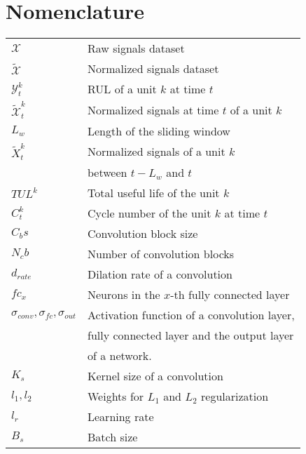 \documentclass[PHM, 2021]{PHMSociety}
\begin{document}
\section*{Nomenclature}

\begin{tabular}{ l  l }
	$\mathcal{X}$			& Raw signals dataset \\
	$\widetilde{\mathcal{X}}$	& Normalized signals dataset\\
	$\mathcal{Y}^k_t$	    & RUL of a unit $k$ at time $t$ \\
	$\widetilde{\mathcal{X}}^k_t$			& Normalized signals at time $t$ of a unit $k$ \\
	$L_w$                   & Length of the sliding window \\
	$\widetilde{X}^k_t$     & Normalized signals of a unit $k$ \\
	\:                      & between $t - L_w$ and $t$ \\
    $TUL^k$                 & Total useful life of the unit $k$ \\
	$C^k_t$                 & Cycle number of the unit $k$ at time $t$     \\ 
	$C_bs$                  & Convolution block size \\
	$N_cb$                  & Number of convolution blocks \\
	$d_{rate}$              & Dilation rate of a convolution \\
	$fc_x$                  & Neurons in the $x$-th fully connected layer\\
	$\sigma_{conv}, \sigma_{fc}, \sigma_{out}$ & Activation function of a convolution layer, \\  
	\:                                            & fully connected layer and the output layer \\ 
	\:                                            & of a network. \\
	$K_s$                   & Kernel size of a convolution \\
	$l_1, l_2$                   & Weights for $L_1$ and $L_2$ regularization  \\
	$l_r$                   & Learning rate  \\
	$B_s$                   & Batch size \\
 \end{tabular}






\end{document}
